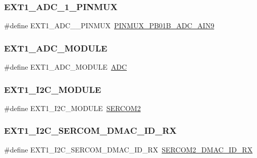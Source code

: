 \subsubsection{\texorpdfstring{EXT1\_ADC\_1\_PINMUX}{EXT1\_ADC\_1\_PINMUX}}
{\footnotesize\ttfamily \#define E\+X\+T1\+\_\+\+A\+D\+C\+\_\+\_\+\+P\+I\+N\+M\+UX~\mbox{\hyperlink{pio_2samd21j18a_8h_a75deb20e2c761ad705cb2d9ed32e222c}{P\+I\+N\+M\+U\+X\+\_\+\+P\+B01\+B\+\_\+\+A\+D\+C\+\_\+\+A\+I\+N9}}}

\mbox{\label{group__samd21__xplained__pro__features__group_gab83ec879d6e7b5c444f1040cc66f6dee}} 
\subsubsection{\texorpdfstring{EXT1\_ADC\_MODULE}{EXT1\_ADC\_MODULE}}
{\footnotesize\ttfamily \#define E\+X\+T1\+\_\+\+A\+D\+C\+\_\+\+M\+O\+D\+U\+LE~\mbox{\hyperlink{group___s_a_m_d21_j18_a__base_ga54d148b91f3d356713f7e367a2243bea}{A\+DC}}}

\mbox{\label{group__samd21__xplained__pro__features__group_ga9a770caae803fb3f8ae9e01beee386b6}} 
\subsubsection{\texorpdfstring{EXT1\_I2C\_MODULE}{EXT1\_I2C\_MODULE}}
{\footnotesize\ttfamily \#define E\+X\+T1\+\_\+\+I2\+C\+\_\+\+M\+O\+D\+U\+LE~\mbox{\hyperlink{group___s_a_m_d21_j18_a__base_ga918e4c85993961a115bb23b4bb73a87f}{S\+E\+R\+C\+O\+M2}}}

\mbox{\label{group__samd21__xplained__pro__features__group_gaec8b03dc380c4b05b0205ddeba9cb72c}} 
\subsubsection{\texorpdfstring{EXT1\_I2C\_SERCOM\_DMAC\_ID\_RX}{EXT1\_I2C\_SERCOM\_DMAC\_ID\_RX}}
{\footnotesize\ttfamily \#define E\+X\+T1\+\_\+\+I2\+C\+\_\+\+S\+E\+R\+C\+O\+M\+\_\+\+D\+M\+A\+C\+\_\+\+I\+D\+\_\+\+RX~\mbox{\hyperlink{sercom2_8h_adbdd3a084fc9f85a052c316d917e46ac}{S\+E\+R\+C\+O\+M2\+\_\+\+D\+M\+A\+C\+\_\+\+I\+D\+\_\+\+RX}}}


